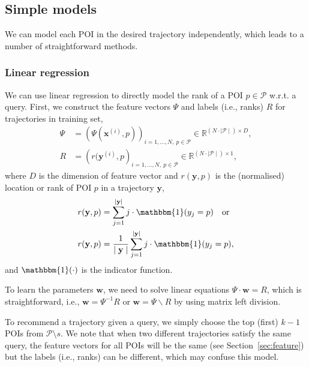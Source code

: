 \documentclass[twocolumn,9pt]{extarticle}
\begin{document}
\subsection{Simple models}
\label{sec:simple}

We can model each POI in the desired trajectory independently, which leads to a number of straightforward methods.



\subsubsection{Linear regression}
\label{sec:linear}

We can use linear regression to directly model the rank of a POI $p \in \mathcal{P}$ w.r.t. a query.
First, we construct the feature vectors $\Psi$ and labels (i.e., ranks) $R$ for trajectories in training set, 
\begin{align*}
\Psi &= \left( \Psi(\mathbf{x}^{(i)}, p) \right)_{i=1,\dots,N,~p \in \mathcal{P}} \in \mathbb{R}^{(N \cdot \mid \mathcal{P} \mid) \times D}, \\
   R &= \left( r(\mathbf{y}^{(i)}, p \right)_{i=1,\dots,N,~p \in \mathcal{P}}     \in \mathbb{R}^{(N \cdot \mid \mathcal{P} \mid) \times 1},
\end{align*}
where $D$ is the dimension of feature vector and $r(\mathbf{y}, p)$ is the (normalised) location or rank of POI $p$ in a trajectory $\mathbf{y}$,
\begin{align*}
r(\mathbf{y}, p) &= \sum_{j=1}^{\mid \mathbf{y} \mid} j \cdot \mathbbm{1}(y_j = p) ~~~\text{or} \\
r(\mathbf{y}, p) &= \frac{1}{\mid \mathbf{y} \mid} \sum_{j=1}^{\mid \mathbf{y} \mid} j \cdot \mathbbm{1}(y_j = p),
\end{align*}
and $\mathbbm{1}(\cdot)$ is the indicator function.

To learn the parameters $\mathbf{w}$, we need to solve linear equations $\Psi \cdot \mathbf{w} = R$,
which is straightforward, i.e., $\mathbf{w} = \Psi^{-1} R$ or $\mathbf{w} = \Psi \backslash R$ by using matrix left division.

To recommend a trajectory given a query, we simply choose the top (first) $k-1$ POIs from $\mathcal{P} \setminus s$.
We note that when two different trajectories satisfy the same query, the feature vectors for all POIs will be the same (see Section~\ref{sec:feature})
but the labels (i.e., ranks) can be different, which may confuse this model.
\end{document}
